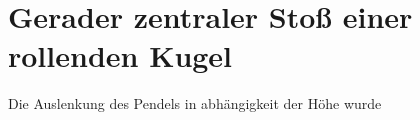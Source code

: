 \section[Rollende Kugel]{Gerader zentraler Stoß einer rollenden Kugel}

Die Auslenkung des Pendels in abhängigkeit der Höhe wurde 




